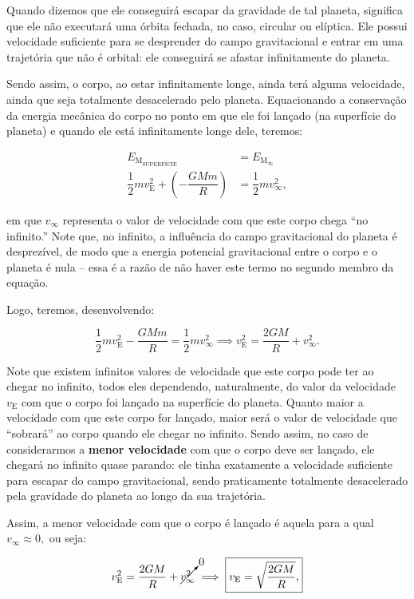 Quando dizemos que ele conseguirá escapar da gravidade de tal planeta, significa que ele não executará uma órbita fechada, no caso, circular ou elíptica. Ele possui velocidade suficiente para se desprender do campo gravitacional e entrar em uma trajetória que não é orbital: ele conseguirá se afastar infinitamente do planeta.

Sendo assim, o corpo, ao estar infinitamente longe, ainda terá alguma velocidade, ainda que seja totalmente desacelerado pelo planeta. Equacionando a conservação da energia mecânica do corpo no ponto em que ele foi lançado (na superfície do planeta) e quando ele está infinitamente longe dele, teremos:

\begin{align}
    E_{\text{M}_\text{SUPERFÍCIE}} &=  E_{\text{M}_{\infty}} \nonumber \\
    \dfrac{1}{2}mv_\text{E}^2 + \left( - \dfrac{GMm}{R}\right) &= \dfrac{1}{2}m v_{\infty}^2, \nonumber 
\end{align}

\noindent em que $v_{\infty}$ representa o valor de velocidade com que este corpo chega ``no infinito.'' Note que, no infinito, a influência do campo gravitacional do planeta é desprezível, de modo que a energia potencial gravitacional entre o corpo e o planeta é nula -- essa é a razão de não haver este termo no segundo membro da equação.

Logo, teremos, desenvolvendo:

$$ \dfrac{1}{2}mv_\text{E}^2  - \dfrac{GMm}{R} = \dfrac{1}{2}m v_{\infty}^2  \implies  v_\text{E}^2 = \dfrac{2GM}{R} + v_{\infty}^2. $$

Note que existem infinitos valores de velocidade que este corpo pode ter ao chegar no infinito, todos eles dependendo, naturalmente, do valor da velocidade $v_\text{E}$ com que o corpo foi lançado na superfície do planeta. Quanto maior a velocidade com que este corpo for lançado, maior será o valor de velocidade que ``sobrará'' ao corpo quando ele chegar no infinito. Sendo assim, no caso de considerarmos a \textbf{menor velocidade} com que o corpo deve ser lançado, ele chegará no infinito quase parando: ele tinha exatamente a velocidade suficiente para escapar do campo gravitacional, sendo praticamente totalmente desacelerado pela gravidade do planeta ao longo da sua trajetória.

Assim, a menor velocidade com que o corpo é lançado é aquela para a qual $ v_{\infty}\approx 0,$ ou seja:

$$ v_\text{E}^2 = \dfrac{2GM}{R} + \cancelto{0}{v_{\infty}^2} \implies \boxed{v_\text{E} = \sqrt{\dfrac{2GM}{R}},} $$

